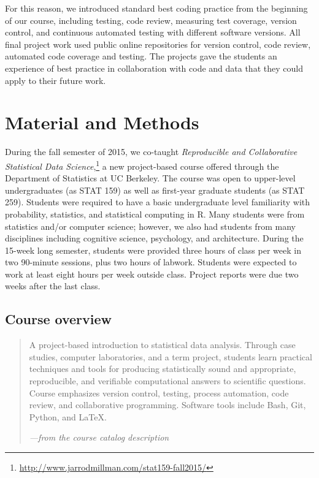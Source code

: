 For this reason, we introduced standard best coding practice from the
beginning of our course, including testing, code review, measuring test
coverage, version control, and continuous automated testing with different
software versions. All final project work used public online repositories for
version control, code review, automated code coverage and testing.  The
projects gave the students an experience of best practice in collaboration
with code and data that they could apply to their future work.

\section{Material and Methods}\label{methods}

During the fall semester of 2015, we co-taught \emph{Reproducible and Collaborative
Statistical Data Science},\footnote{\url{http://www.jarrodmillman.com/stat159-fall2015/}}
a new project-based course offered through the Department of Statistics at UC Berkeley.
The course was open to upper-level undergraduates (as STAT 159) as well as
first-year graduate students (as STAT 259).
Students were required to have a basic undergraduate level familiarity with
probability, statistics, and statistical computing in R.
Many students were from statistics and/or computer science; however, we also
had students from many disciplines including cognitive science, psychology, and
architecture.
During the 15-week long semester, students were provided three hours of class
per week in two 90-minute sessions, plus two hours of labwork.
Students were expected to work at least eight hours per week outside class.
Project reports were due two weeks after the last class.

\subsection{Course overview}

\begin{quote}
A project-based introduction to statistical data analysis. Through case
studies, computer laboratories, and a term project, students learn
practical techniques and tools for producing statistically sound and
appropriate, reproducible, and verifiable computational answers to
scientific questions. Course emphasizes version control, testing,
process automation, code review, and collaborative programming.
Software tools include Bash, Git, Python, and \LaTeX.

\hfill\emph{---from the course catalog description}
\end{quote}

